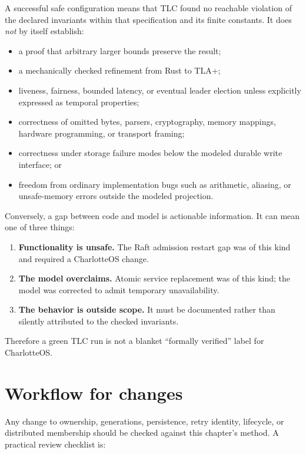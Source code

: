A successful safe configuration means that TLC found no reachable violation
of the declared invariants within that specification and its finite constants.
It does \emph{not} by itself establish:

\begin{itemize}
    \item a proof that arbitrary larger bounds preserve the result;
    \item a mechanically checked refinement from Rust to TLA+;
    \item liveness, fairness, bounded latency, or eventual leader election
        unless explicitly expressed as temporal properties;
    \item correctness of omitted bytes, parsers, cryptography, memory mappings,
        hardware programming, or transport framing;
    \item correctness under storage failure modes below the modeled durable
        write interface; or
    \item freedom from ordinary implementation bugs such as arithmetic,
        aliasing, or unsafe-memory errors outside the modeled projection.
\end{itemize}

Conversely, a gap between code and model is actionable information. It can
mean one of three things:

\begin{enumerate}
    \item \textbf{Functionality is unsafe.} The Raft admission restart gap was
        of this kind and required a CharlotteOS change.
    \item \textbf{The model overclaims.} Atomic service replacement was of this
        kind; the model was corrected to admit temporary unavailability.
    \item \textbf{The behavior is outside scope.} It must be documented rather
        than silently attributed to the checked invariants.
\end{enumerate}

Therefore a green TLC run is not a blanket ``formally verified'' label for
CharlotteOS.

\section{Workflow for changes}

Any change to ownership, generations, persistence, retry identity, lifecycle,
or distributed membership should be checked against this chapter's method.
A practical review checklist is:

